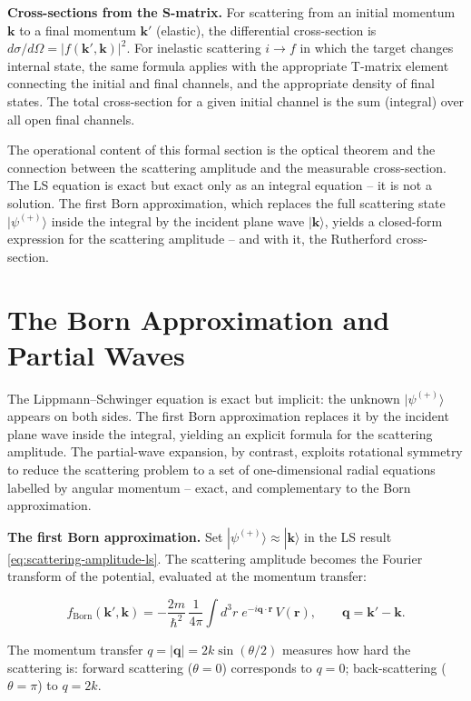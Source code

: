 \medskip\noindent\textbf{Cross-sections from the S-matrix.}
For scattering from an initial momentum $\bm k$ to a final momentum $\bm k'$ (elastic), the differential cross-section is $d\sigma/d\Omega = |f(\bm k',\bm k)|^{2}$. For inelastic scattering $i \to f$ in which the target changes internal state, the same formula applies with the appropriate T-matrix element connecting the initial and final channels, and the appropriate density of final states. The total cross-section for a given initial channel is the sum (integral) over all open final channels.

The operational content of this formal section is the optical theorem and the connection between the scattering amplitude and the measurable cross-section. The LS equation is exact but exact only as an integral equation -- it is not a solution. The first Born approximation, which replaces the full scattering state $|\psi^{(+)}\rangle$ inside the integral by the incident plane wave $|\bm k\rangle$, yields a closed-form expression for the scattering amplitude -- and with it, the Rutherford cross-section.

\section{The Born Approximation and Partial Waves}
\label{sec:born-partial-waves}

The Lippmann--Schwinger equation is exact but implicit: the unknown $|\psi^{(+)}\rangle$ appears on both sides. The first Born approximation replaces it by the incident plane wave inside the integral, yielding an explicit formula for the scattering amplitude. The partial-wave expansion, by contrast, exploits rotational symmetry to reduce the scattering problem to a set of one-dimensional radial equations labelled by angular momentum -- exact, and complementary to the Born approximation.

\medskip\noindent\textbf{The first Born approximation.}
Set $|\psi^{(+)}\rangle \approx |\bm k\rangle$ in the LS result \eqref{eq:scattering-amplitude-ls}. The scattering amplitude becomes the Fourier transform of the potential, evaluated at the momentum transfer:
\begin{linenomath}
\begin{equation}
f_{\text{Born}}(\bm k',\bm k) = -\frac{2m}{\hbar^{2}}\,\frac{1}{4\pi}\int d^{3}r\;e^{-i\bm q\cdot\bm r}\,V(\bm r),
\qquad \bm q = \bm k' - \bm k.
\label{eq:born-amplitude}
\end{equation}
\end{linenomath}
The momentum transfer $q = |\bm q| = 2k\sin(\theta/2)$ measures how hard the scattering is: forward scattering ($\theta=0$) corresponds to $q=0$; back-scattering ($\theta=\pi$) to $q=2k$.


